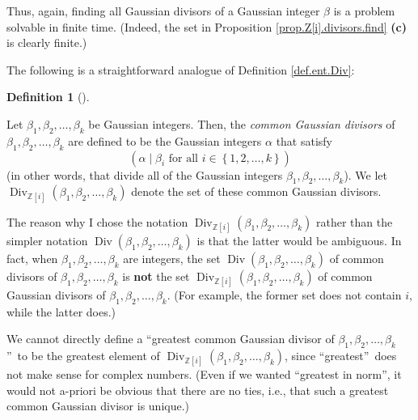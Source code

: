 \documentclass[numbers=enddot,12pt,final,onecolumn,notitlepage]{scrartcl}%
\numberwithin{exer}{subsection}
\theoremstyle{definition}
\newtheorem{defi}[theo]{Definition}
\newenvironment{definition}[1][]
{\begin{defi}[#1]\begin{leftbar}}
{\end{leftbar}\end{defi}}
\begin{document}
Thus, again, finding all Gaussian divisors of a Gaussian integer $\beta$ is a
problem solvable in finite time. (Indeed, the set in Proposition
\ref{prop.Z[i].divisors.find} \textbf{(c)} is clearly finite.)

The following is a straightforward analogue of Definition \ref{def.ent.Div}:

\begin{definition}
\label{def.Z[i].Div}Let $\beta_{1},\beta_{2},\ldots,\beta_{k}$ be Gaussian
integers. Then, the \textit{common Gaussian divisors} of $\beta_{1},\beta
_{2},\ldots,\beta_{k}$ are defined to be the Gaussian integers $\alpha$ that
satisfy%
\begin{equation}
\left(  \alpha\mid\beta_{i}\text{ for all }i\in\left\{  1,2,\ldots,k\right\}
\right)  \label{eq.def.Z[i].Div.cond}%
\end{equation}
(in other words, that divide all of the Gaussian integers $\beta_{1},\beta
_{2},\ldots,\beta_{k}$). We let $\operatorname*{Div}\nolimits_{\mathbb{Z}%
\left[  i\right]  }\left(  \beta_{1},\beta_{2},\ldots,\beta_{k}\right)  $
denote the set of these common Gaussian divisors.
\end{definition}

The reason why I chose the notation $\operatorname*{Div}\nolimits_{\mathbb{Z}%
\left[  i\right]  }\left(  \beta_{1},\beta_{2},\ldots,\beta_{k}\right)  $
rather than the simpler notation $\operatorname*{Div}\left(  \beta_{1}%
,\beta_{2},\ldots,\beta_{k}\right)  $ is that the latter would be ambiguous.
In fact, when $\beta_{1},\beta_{2},\ldots,\beta_{k}$ are integers, the set
$\operatorname*{Div}\left(  \beta_{1},\beta_{2},\ldots,\beta_{k}\right)  $ of
common divisors of $\beta_{1},\beta_{2},\ldots,\beta_{k}$ is \textbf{not} the
set $\operatorname*{Div}\nolimits_{\mathbb{Z}\left[  i\right]  }\left(
\beta_{1},\beta_{2},\ldots,\beta_{k}\right)  $ of common Gaussian divisors of
$\beta_{1},\beta_{2},\ldots,\beta_{k}$. (For example, the former set does not
contain $i$, while the latter does.)

We cannot directly define a \textquotedblleft greatest common Gaussian divisor
of $\beta_{1},\beta_{2},\ldots,\beta_{k}$\textquotedblright\ to be the
greatest element of $\operatorname*{Div}\nolimits_{\mathbb{Z}\left[  i\right]
}\left(  \beta_{1},\beta_{2},\ldots,\beta_{k}\right)  $, since
\textquotedblleft greatest\textquotedblright\ does not make sense for complex
numbers. (Even if we wanted \textquotedblleft greatest in
norm\textquotedblright, it would not a-priori be obvious that there are no
ties, i.e., that such a greatest common Gaussian divisor is unique.)
\end{document}
